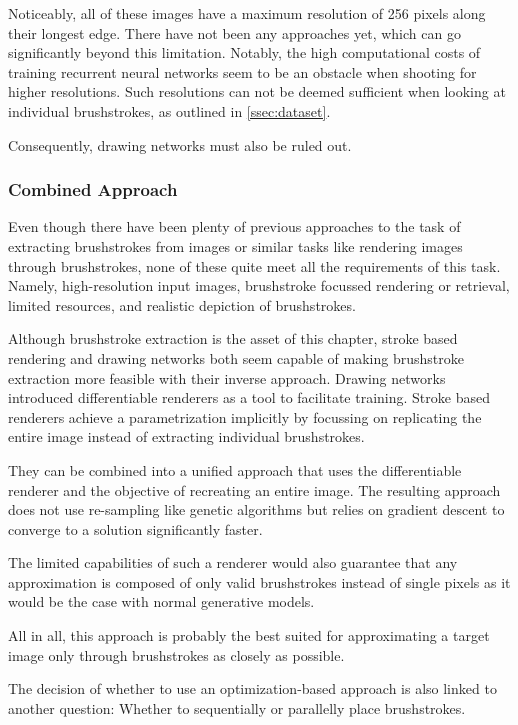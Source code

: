 Noticeably, all of these images have a maximum resolution of 256 pixels along their longest edge.
There have not been any approaches yet, which can go significantly beyond this limitation.
Notably, the high computational costs of training recurrent neural networks seem to be an obstacle when shooting for higher resolutions.
Such resolutions can not be deemed sufficient when looking at individual brushstrokes, as outlined in \ref{ssec:dataset}.

Consequently, drawing networks must also be ruled out.

\subsubsection{Combined Approach}

Even though there have been plenty of previous approaches to the task of extracting brushstrokes from images or similar tasks like rendering images through brushstrokes, none of these quite meet all the requirements of this task.
Namely, high-resolution input images, brushstroke focussed rendering or retrieval, limited resources, and realistic depiction of brushstrokes.

Although brushstroke extraction is the asset of this chapter, stroke based rendering and drawing networks both seem capable of making brushstroke extraction more feasible with their inverse approach.
Drawing networks introduced differentiable renderers as a tool to facilitate training.
Stroke based renderers achieve a parametrization implicitly by focussing on replicating the entire image instead of extracting individual brushstrokes.

They can be combined into a unified approach that uses the differentiable renderer and the objective of recreating an entire image.
The resulting approach does not use re-sampling like genetic algorithms but relies on gradient descent to converge to a solution significantly faster.

The limited capabilities of such a renderer would also guarantee that any approximation is composed of only valid brushstrokes instead of single pixels as it would be the case with normal generative models.

All in all, this approach is probably the best suited for approximating a target image only through brushstrokes as closely as possible.


The decision of whether to use an optimization-based approach is also linked to another question: Whether to sequentially or parallelly place brushstrokes.

